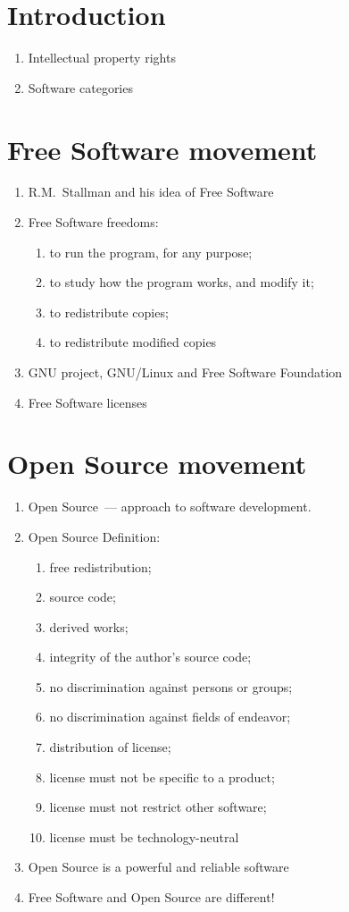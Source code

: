 \documentclass[10pt,a4paper]{article}
\newcommand{\bee}{\begin{enumerate}\setlength{\itemsep}{-0.65mm}}
\newcommand{\ene}{\end{enumerate}}
\begin{document}
\begin{multicols}{2}

\section*{Introduction}
\bee
  \item Intellectual property rights
  \item Software categories
\ene

\section{Free Software movement}

\bee
  \item R.M.~Stallman and his idea of Free Software
  \item Free Software freedoms:
  \bee
    \item[0.] to run the program, for any purpose;
    \item[1.] to study how the program works, and modify it;
    \item[2.] to redistribute copies;
    \item[3.] to redistribute modified copies
  \ene
  \item GNU project, GNU/Linux and Free Software Foundation
  \item Free Software licenses
\ene

\section{Open Source movement}
\bee
  \item Open Source~--- approach to software development.
  \item Open Source Definition:
  \bee
    \item[1.] free redistribution;
    \item[2.] source code;
    \item[3.] derived works;
    \item[4.] integrity of the author's source code;
    \item[5.] no discrimination against persons or groups;
    \item[6.] no discrimination against fields of endeavor;
    \item[7.] distribution of license;
    \item[8.] license must not be specific to a product;
    \item[9.] license must not restrict other software;
    \item[10.] license must be technology-neutral
  \ene
  \item Open Source is a powerful and reliable software
  \item Free Software and Open Source are different!
\ene


\end{multicols}
\end{document}
